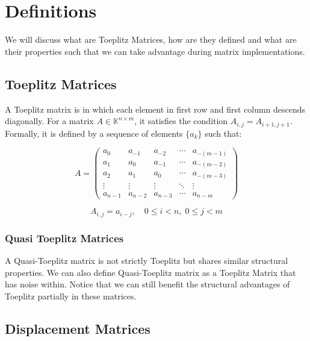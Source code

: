 \section{Definitions}

We will discuss what are Toeplitz Matrices, how are they defined and what are their properties such that we can take advantage
during matrix implementations.

\subsection{Toeplitz Matrices}

A Toeplitz matrix is in which each element in first row and first column descends diagonally.
For a matrix $A \in \mathbb{K}^{n \times m}$, it satisfies the condition $A_{i,j} = A_{i+1, j+1}$.
Formally, it is defined by a sequence of elements $\{a_k\}$ such that:

\begin{equation}
    A =
    \begin{pmatrix}
        a_0     & a_{-1}  & a_{-2}  & \cdots & a_{-(m-1)} \\
        a_1     & a_0     & a_{-1}  & \cdots & a_{-(m-2)} \\
        a_2     & a_1     & a_0     & \cdots & a_{-(m-3)} \\
        \vdots  & \vdots  & \vdots  & \ddots & \vdots     \\
        a_{n-1} & a_{n-2} & a_{n-3} & \cdots & a_{n-m}
    \end{pmatrix}
\end{equation}

\[
    A_{i,j} = a_{i-j}, \quad 0 \le i < n,\; 0 \le j < m
\]

\subsubsection{Quasi Toeplitz Matrices}

A Quasi-Toeplitz matrix is not strictly Toeplitz but shares similar structural properties.
We can also define Quasi-Toeplitz matrix as a Toeplitz Matrix that has noise within.
Notice that we can still benefit the structural advantages of Toeplitz partially in these matrices.

\subsection{Displacement Matrices}

